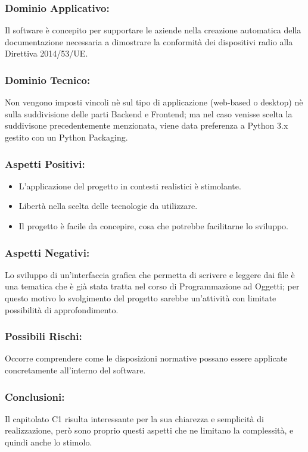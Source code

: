 \documentclass[a4paper,12pt]{article}
\begin{document}
\subsubsection*{Dominio Applicativo:} Il software è concepito per supportare le aziende nella creazione automatica della documentazione necessaria a dimostrare la conformità dei dispositivi radio alla Direttiva 2014/53/UE. 
\subsubsection*{Dominio Tecnico:} Non vengono imposti vincoli nè sul tipo di applicazione (web-based o desktop) nè sulla suddivisione delle parti Backend e Frontend; ma nel caso venisse scelta la suddivisone precedentemente menzionata, viene data preferenza a Python 3.x gestito con un Python Packaging.
\subsubsection*{Aspetti Positivi:}
\begin{itemize}
    \item L'applicazione del progetto in contesti realistici è stimolante.
    \item Libertà nella scelta delle tecnologie da utilizzare.
    \item Il progetto è facile da concepire, cosa che potrebbe facilitarne lo sviluppo.
\end{itemize}

\subsubsection*{Aspetti Negativi:}
Lo sviluppo di un'interfaccia grafica che permetta di scrivere e leggere dai file è una tematica che è già stata tratta nel corso di Programmazione ad Oggetti; per questo motivo lo svolgimento del progetto sarebbe un'attività con limitate possibilità di approfondimento.

\subsubsection*{Possibili Rischi:}
Occorre comprendere come le disposizioni normative possano essere applicate concretamente all'interno del software.

\subsubsection*{Conclusioni:}
Il capitolato C1 risulta interessante per la sua chiarezza e semplicità di realizzazione, però sono proprio questi aspetti che ne limitano la complessità, e quindi anche lo stimolo.
\end{document}
